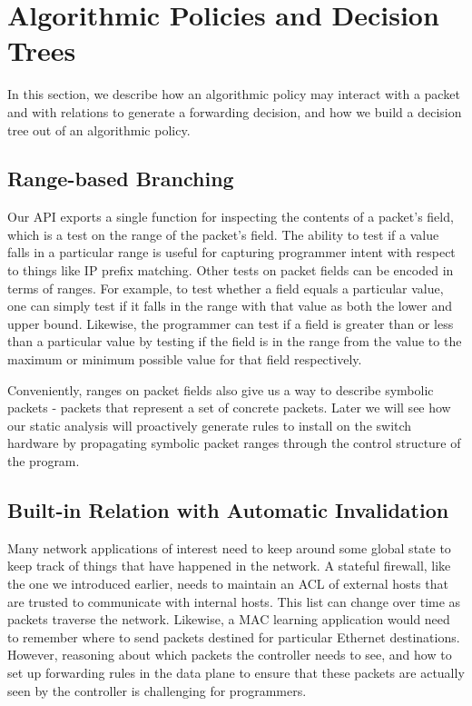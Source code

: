 \documentclass[preprint]{sigplanconf}
\begin{document}
\section*{Algorithmic Policies and Decision Trees}
In this section, we describe how an algorithmic policy may interact with a packet and with relations to generate a forwarding decision, and how we build a decision tree out of an algorithmic policy.

   \subsection*{Range-based Branching}
   

   Our API exports a single function for inspecting the contents of a packet's field, which is a test on the range of the packet's field. The ability to test if a value falls in a particular range is useful for capturing programmer intent with respect to things like IP prefix matching. Other tests on packet fields can be encoded in terms of ranges. For example, to test whether a field equals a particular value, one can simply test if it falls in the range with that value as both the lower and upper bound. Likewise, the programmer can test if a field is greater than or less than a particular value by testing if the field is in the range from the value to the maximum or minimum possible value for that field respectively. 
   
Conveniently, ranges on packet fields also give us a way to describe symbolic packets - packets that represent a set of concrete packets. Later we will see how our static analysis will proactively generate rules to install on the switch hardware by propagating symbolic packet ranges through the control structure of the program.



     \subsection*{Built-in Relation with Automatic Invalidation}
	Many network applications of interest need to keep around some global state to keep track of things that have happened in the network. A stateful firewall, like the one we introduced earlier, needs to maintain an ACL of external hosts that are trusted to communicate with internal hosts. This list can change over time as packets traverse the network. Likewise, a MAC learning application would need to remember where to send packets destined for particular Ethernet destinations. However, reasoning about which packets the controller needs to see, and how to set up forwarding rules in the data plane to ensure that these packets are actually seen by the controller is challenging for programmers.
	
\end{document}
